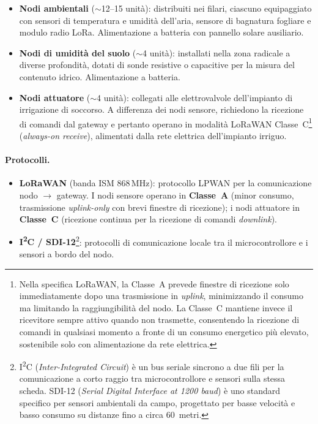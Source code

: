 \begin{itemize}
	\item \textbf{Nodi ambientali} ($\sim$12--15 unità): distribuiti nei filari, ciascuno equipaggiato con sensori di temperatura e umidità dell'aria, sensore di bagnatura fogliare e modulo radio LoRa. Alimentazione a batteria con pannello solare ausiliario.

	\item \textbf{Nodi di umidità del suolo} ($\sim$4 unità): installati nella zona radicale a diverse profondità, dotati di sonde resistive o capacitive per la misura del contenuto idrico. Alimentazione a batteria.

	\item \textbf{Nodi attuatore} ($\sim$4 unità): collegati alle elettrovalvole dell'impianto di irrigazione di soccorso. A differenza dei nodi sensore, richiedono la ricezione di comandi dal gateway e pertanto operano in modalità LoRaWAN Classe~C\footnote{Nella specifica LoRaWAN, la Classe~A prevede finestre di ricezione solo immediatamente dopo una trasmissione in \textit{uplink}, minimizzando il consumo ma limitando la raggiungibilità del nodo. La Classe~C mantiene invece il ricevitore sempre attivo quando non trasmette, consentendo la ricezione di comandi in qualsiasi momento a fronte di un consumo energetico più elevato, sostenibile solo con alimentazione da rete elettrica.} (\textit{always-on receive}), alimentati dalla rete elettrica dell'impianto irriguo.
\end{itemize}

\paragraph{Protocolli.}

\begin{itemize}
	\item \textbf{LoRaWAN} (banda ISM 868\,MHz): protocollo LPWAN per la comunicazione nodo $\rightarrow$ gateway. I nodi sensore operano in \textbf{Classe~A} (minor consumo, trasmissione \textit{uplink-only} con brevi finestre di ricezione); i nodi attuatore in \textbf{Classe~C} (ricezione continua per la ricezione di comandi \textit{downlink}).
	\item \textbf{I\textsuperscript{2}C / SDI-12}\footnote{I\textsuperscript{2}C (\textit{Inter-Integrated Circuit}) è un bus seriale sincrono a due fili per la comunicazione a corto raggio tra microcontrollore e sensori sulla stessa scheda. SDI-12 (\textit{Serial Digital Interface at 1200 baud}) è uno standard specifico per sensori ambientali da campo, progettato per basse velocità e basso consumo su distanze fino a circa 60~metri.}: protocolli di comunicazione locale tra il microcontrollore e i sensori a bordo del nodo.
\end{itemize}



